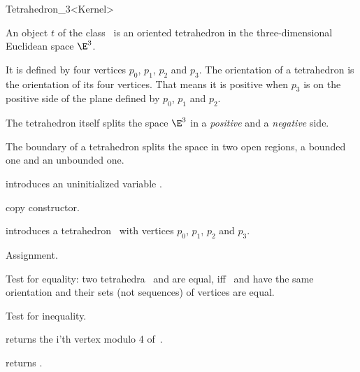 \begin{ccRefClass} {Tetrahedron_3<Kernel>}

\ccDefinition  An object $t$ of the class \ccRefName\ is an oriented
tetrahedron in the three-dimensional Euclidean space $\E^3$. 

It is defined by four vertices $p_0$, $p_1$, $p_2$ and $p_3$.
The orientation of a tetrahedron is the orientation of its four 
vertices. That means it is positive when $p_3$ is on the positive
side of the plane defined by $p_0$, $p_1$ and $p_2$.

The tetrahedron itself splits the space $\E^3$ in a {\em positive} and
a {\em negative} side.
 
The boundary of a tetrahedron splits the space in two open regions, a
bounded one and an unbounded one.

\ccCreation
{}


\ccHidden {}
             {introduces an uninitialized variable \ccVar.}

\ccHidden {}
 	    {copy constructor.}


            {introduces a tetrahedron \ccVar\ with vertices $p_0$, $p_1$, $p_2$ and $p_3$.}


\ccOperations

\ccHidden {}
        {Assignment.}

       {Test for equality: two tetrahedra \ccVar\ and  are equal, 
        iff \ccVar\ and  have the same orientation and 
        their sets (not sequences) of vertices are equal.}

       {Test for inequality.}

       {returns the i'th vertex modulo 4  of~\ccVar.}

       {returns .}


\end{ccRefClass}
